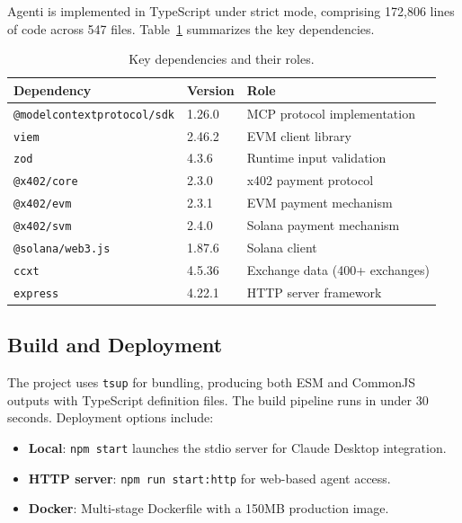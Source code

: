 \documentclass[11pt]{article}
\begin{document}
Agenti is implemented in TypeScript under strict mode, comprising 172,806 lines of code across 547 files. Table~\ref{tab:deps} summarizes the key dependencies.

\begin{table}[h]
\centering
\caption{Key dependencies and their roles.}
\label{tab:deps}
\begin{tabular}{@{}lll@{}}
\toprule
\textbf{Dependency} & \textbf{Version} & \textbf{Role} \\
\midrule
\texttt{@modelcontextprotocol/sdk} & 1.26.0 & MCP protocol implementation \\
\texttt{viem}                       & 2.46.2 & EVM client library \\
\texttt{zod}                        & 4.3.6  & Runtime input validation \\
\texttt{@x402/core}                 & 2.3.0  & x402 payment protocol \\
\texttt{@x402/evm}                  & 2.3.1  & EVM payment mechanism \\
\texttt{@x402/svm}                  & 2.4.0  & Solana payment mechanism \\
\texttt{@solana/web3.js}            & 1.87.6 & Solana client \\
\texttt{ccxt}                       & 4.5.36 & Exchange data (400+ exchanges) \\
\texttt{express}                    & 4.22.1 & HTTP server framework \\
\bottomrule
\end{tabular}
\end{table}

\subsection{Build and Deployment}

The project uses \texttt{tsup} for bundling, producing both ESM and CommonJS outputs with TypeScript definition files. The build pipeline runs in under 30 seconds. Deployment options include:

\begin{itemize}[leftmargin=*]
  \item \textbf{Local}: \texttt{npm start} launches the stdio server for Claude Desktop integration.
  \item \textbf{HTTP server}: \texttt{npm run start:http} for web-based agent access.
  \item \textbf{Docker}: Multi-stage Dockerfile with a 150MB production image.
\end{itemize}
\end{document}
